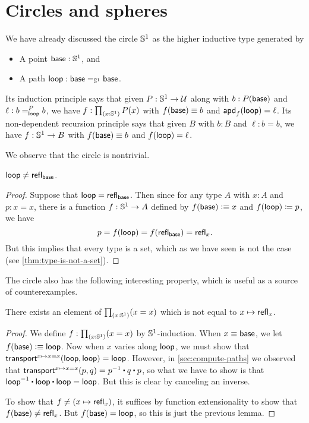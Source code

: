 \section{Circles and spheres}
\label{sec:circle}

%
%
We have already discussed the circle $\Sn^1$ as the higher inductive type generated by
\begin{itemize}
\item A point $\base:\Sn^1$, and
\item A path $\lloop : {\id[\Sn^1]\base\base}$.
\end{itemize}
%
Its induction principle says that given $P:\Sn^1\to\type$ along with $b:P(\base)$ and $\ell :\dpath P \lloop b b$, we have $f:\prd{x:\Sn^1} P(x)$ with $f(\base)\jdeq b$ and $\apd f \lloop = \ell$.
Its non-dependent recursion principle says that given $B$ with $b:B$ and $\ell:b=b$, we have $f:\Sn^1\to B$ with $f(\base)\jdeq b$ and $\ap f \lloop = \ell$.

We observe that the circle is nontrivial.

\begin{lem}\label{thm:loop-nontrivial}
  $\lloop\neq\refl{\base}$.
\end{lem}
\begin{proof}
  Suppose that $\lloop=\refl{\base}$.
  Then since for any type $A$ with $x:A$ and $p:x=x$, there is a function $f:\Sn^1\to A$ defined by $f(\base)\defeq x$ and $\ap f \lloop \defid p$, we have
  \[p = f(\lloop) = f(\refl{\base}) = \refl{x}.\]
  But this implies that every type is a set, which as we have seen is not the case (see \autoref{thm:type-is-not-a-set}).
\end{proof}

The circle also has the following interesting property, which is useful as a source of counterexamples.

\begin{lem}\label{thm:S1-autohtpy}
  There exists an element of $\prd{x:\Sn^1} (x=x)$ which is not equal to $x\mapsto \refl{x}$.
\end{lem}
\begin{proof}
  We define $f:\prd{x:\Sn^1} (x=x)$ by $\Sn^1$-induction.
  When $x\jdeq \base$, we let $f(\base)\defeq \lloop$.
  Now when $x$ varies along $\lloop$, we must show that $\transfib{x\mapsto x=x}{\lloop}{\lloop} = \lloop$.
  However, in \autoref{sec:compute-paths} we observed that $\transfib{x\mapsto x=x}{p}{q} = \opp{p} \ct q \ct p$, so what we have to show is that $\opp{\lloop} \ct \lloop \ct \lloop = \lloop$.
  But this is clear by canceling an inverse.

  To show that $f\neq (x\mapsto \refl{x})$, it suffices by function extensionality to show that $f(\base) \neq \refl{x}$.
  But $f(\base)=\lloop$, so this is just the previous lemma.
\end{proof}

